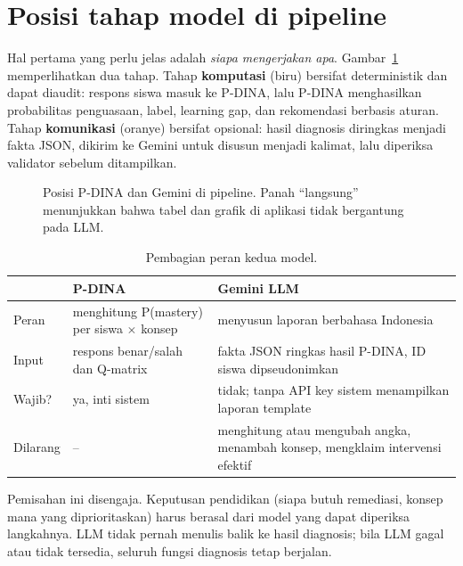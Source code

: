 \documentclass[11pt,a4paper]{article}
\begin{document}
\section{Posisi tahap model di pipeline}

Hal pertama yang perlu jelas adalah \emph{siapa mengerjakan apa}. Gambar~\ref{fig:posisi} memperlihatkan dua tahap.
Tahap \textbf{komputasi} (biru) bersifat deterministik dan dapat diaudit: respons siswa masuk ke P-DINA, lalu P-DINA
menghasilkan probabilitas penguasaan, label, learning gap, dan rekomendasi berbasis aturan. Tahap \textbf{komunikasi}
(oranye) bersifat opsional: hasil diagnosis diringkas menjadi fakta JSON, dikirim ke Gemini untuk disusun menjadi
kalimat, lalu diperiksa validator sebelum ditampilkan.

\begin{figure}[h]
  \centering
  \resizebox{\linewidth}{!}{}
  \caption{Posisi P-DINA dan Gemini di pipeline. Panah ``langsung'' menunjukkan bahwa tabel dan grafik di aplikasi
  tidak bergantung pada LLM.}
  \label{fig:posisi}
\end{figure}

\begin{table}[h]
  \centering\small
  \begin{tabularx}{\linewidth}{@{}l L L@{}}
    \toprule
    & \textbf{P-DINA} & \textbf{Gemini LLM} \\
    \midrule
    Peran & menghitung P(mastery) per siswa $\times$ konsep & menyusun laporan berbahasa Indonesia \\
    Input & respons benar/salah dan Q-matrix & fakta JSON ringkas hasil P-DINA, ID siswa dipseudonimkan \\
    Wajib? & ya, inti sistem & tidak; tanpa API key sistem menampilkan laporan template \\
    Dilarang & -- & menghitung atau mengubah angka, menambah konsep, mengklaim intervensi efektif \\
    \bottomrule
  \end{tabularx}
  \caption{Pembagian peran kedua model.}
\end{table}

Pemisahan ini disengaja. Keputusan pendidikan (siapa butuh remediasi, konsep mana yang diprioritaskan) harus berasal
dari model yang dapat diperiksa langkahnya. LLM tidak pernah menulis balik ke hasil diagnosis; bila LLM gagal atau
tidak tersedia, seluruh fungsi diagnosis tetap berjalan.

\end{document}
